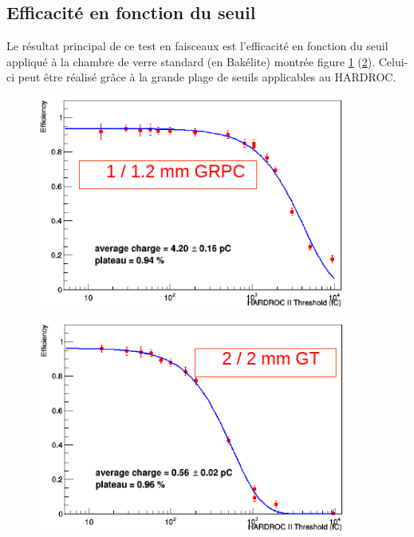 \subsection{Efficacité en fonction du seuil}
Le résultat principal de ce test en faisceaux est l'efficacité en fonction du seuil appliqué à la chambre de verre standard (en Bakélite) montrée figure \ref{effithrchi} (\ref{effithrbak}). Celui-ci peut être réalisé grâce à la grande plage de seuils applicables au HARDROC.

\begin{figure}[ht!]
	\centering
	\includegraphics[width=0.90\textwidth]{GLA/effithrchi.png}
	\label{effithrchi}
\end{figure}

\begin{figure}[ht!]
	\centering
	\includegraphics[width=0.90\textwidth]{GLA/effithrbak.png}
	\label{effithrbak}
\end{figure}

